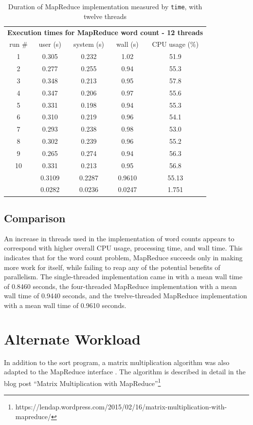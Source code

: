 \documentclass[12pt, letterpaper]{article}
\begin{document}
	\begin{table}[h]
	\centering
	\begin{tabular}{ccccc}
	\multicolumn{5}{c}{\cellcolor[HTML]{FFFFC7}\textbf{Execution times for MapReduce word count - 12 threads}} \\
	\rowcolor[HTML]{EFEFEF} 
	run \# & user (s) & system (s) & wall (s) & CPU usage (\%) \\
	1 & 0.305 & 0.232 & 1.02 & 51.9 \\
	2 & 0.277 & 0.255 & 0.94 & 55.3 \\
	3 & 0.348 & 0.213 & 0.95 & 57.8 \\
	4 & 0.347 & 0.206 & 0.97 & 55.6 \\
	5 & 0.331 & 0.198 & 0.94 & 55.3 \\
	6 & 0.310 & 0.219 & 0.96 & 54.1 \\
	7 & 0.293 & 0.238 & 0.98 & 53.0 \\
	8 & 0.302 & 0.239 & 0.96 & 55.2 \\
	9 & 0.265 & 0.274 & 0.94 & 56.3 \\
	10 & 0.331 & 0.213 & 0.95 & 56.8 \\
	\rowcolor[HTML]{D0F0D0} 
	\multicolumn{1}{r}{\cellcolor[HTML]{9AFF99}mean (s)} & 0.3109 & 0.2287 & 0.9610 & 55.13 \\
	\rowcolor[HTML]{ECF4FF} 
	\multicolumn{1}{r}{\cellcolor[HTML]{DAE8FC}std. dev. (s)} & 0.0282 & 0.0236 & 0.0247 & 1.751
	\end{tabular}
	\caption{Duration of MapReduce implementation measured by \texttt{time}, with twelve threads\label{table:MR12ImplWC}}
	\end{table}
\subsection{Comparison}
	An increase in threads used in the implementation of word counts appears to correspond with higher overall CPU usage, processing time, and wall time.
	This indicates that for the word count problem, MapReduce succeeds only in making more work for itself, while failing to reap any of the potential benefits of parallelism.
	The single-threaded implementation came in with a mean wall time of 0.8460 seconds, the four-threaded MapReduce implementation with a mean wall time of 0.9440 seconds, and the twelve-threaded MapReduce implementation with a mean wall time of 0.9610 seconds.
	
\section{Alternate Workload}
In addition to the sort program, a matrix multiplication algorithm was also adapted to the MapReduce interface . The algorithm is described in detail in the blog post “Matrix Multiplication with MapReduce”\footnote{https://lendap.wordpress.com/2015/02/16/matrix-multiplication-with-mapreduce/}
\end{document}
